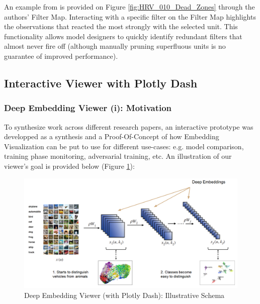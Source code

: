 An example from \cite{Pezzotti2018DeepEyesPV} is provided on Figure \ref{fig:HRV_010_Dead_Zones} through the authors' Filter Map. Interacting with a specific filter on the Filter Map highlights the observations that reacted the most strongly with the selected unit. This functionality allows model designers to quickly identify redundant filters that almost never fire off (although manually pruning superfluous units is no guarantee of improved performance).


\subsection{Interactive Viewer with Plotly Dash}

\subsubsection{Deep Embedding Viewer (i): Motivation}

To synthesize work across different research papers, an interactive prototype was developped as a synthesis and a Proof-Of-Concept of how Embedding Visualization can be put to use for different use-cases: e.g. model comparison, training phase monitoring, adversarial training, etc. An illustration of our viewer's goal is provided below (Figure \ref{fig:HRV_011_DEV_Schema}):


\vspace{0.2cm}

\begin{figure}[H]
	\centering
	\includegraphics[scale=0.65]{images/embedding_view/HRV_Fig_011_Schema.PNG}
	\caption{Deep Embedding Viewer (with Plotly Dash): Illustrative Schema}
	\label{fig:HRV_011_DEV_Schema}
\end{figure}

\vspace{0.2cm}


